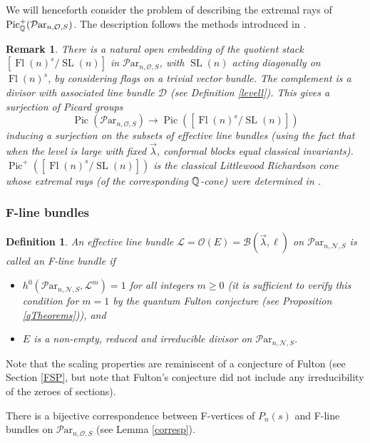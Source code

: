 \documentclass[11pt]{amsart}
\newcommand\op{\operatorname}
\newcommand\Pic{\operatorname{Pic}}
\newcommand\ml{\mathcal{L}}
\newcommand\Par{\mathcal{P}\text{ar} }
\newtheorem{remark}[theorem]{ Remark}
\newtheorem{defi}[theorem]{Definition}
\numberwithin{theorem}{subsection}
\begin{document}
We will henceforth consider the problem of describing the extremal rays of $\Pic^+_{\Bbb{Q}}(\Par_{n,\mathcal{O},S})$. The description follows the methods introduced in  \cite{BHermit,BKiers,Kiers}.

\begin{remark}\label{classicall}
There is a natural open embedding of the quotient stack   $[\op{Fl}(n)^s/\op{SL}(n)]$ in $\Par_{n,\mathcal{O},S}$, with $\op{SL}(n)$ acting diagonally on $\op{Fl}(n)^s$, by considering flags on a trivial vector bundle. The complement is a divisor with associated line bundle $\mathcal{D}$ (see Definition \ref{levell}). This gives a surjection of Picard groups
$$\Pic(\Par_{n,\mathcal{O},S})\to \Pic([\op{Fl}(n)^s/\op{SL}(n)])$$
inducing a surjection on the subsets of effective line bundles (using the fact that when the level is large with fixed $\vec{\lambda}$, conformal blocks equal classical invariants).  $\Pic^+([\op{Fl}(n)^s/\op{SL}(n)])$ is the classical Littlewood Richardson cone whose extremal rays (of the corresponding $\Bbb{Q}$-cone) were determined in \cite{BHermit}.
\end{remark}
\subsubsection{F-line bundles}\label{Def_F}
  \begin{defi}\label{defF}
 An effective line bundle $\ml=\mathcal{O}(E)=\mathcal{B}(\vec{\lambda},\ell)$ on $\Par_{n,\mathcal{N},S}$ is called an F-line bundle if
 \begin{itemize}
 \item[-]$h^0(\Par_{n,\mathcal{N},S},\mathcal{L}^m)=1$ for all integers $m\geq 0$ (it is sufficient to verify this condition for $m=1$ by the quantum Fulton conjecture (see Proposition \ref{qTheorems})), and
 \item[-] $E$ is a non-empty, reduced and irreducible divisor on $\Par_{n,\mathcal{N},S}$.
 \end{itemize}
 \end{defi}
 Note that the scaling properties are reminiscent of a conjecture of Fulton (see Section \ref{FSP}, but note that Fulton's conjecture did not include any irreducibility of the zeroes of sections).

There is a bijective correspondence between  F-vertices of $P_{n}(s)$ and  F-line bundles on $\Par_{n,\mathcal{O},S}$ (see Lemma \ref{corresp}).
\end{document}
